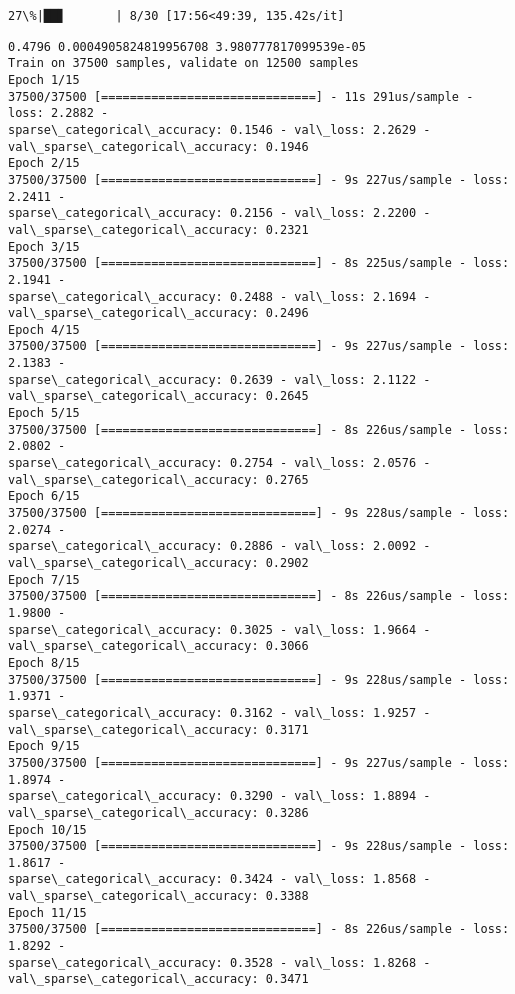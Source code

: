 \documentclass[11pt]{article}
\begin{document}
    \begin{Verbatim}[commandchars=\\\{\}]
 27\%|██▋       | 8/30 [17:56<49:39, 135.42s/it]
    \end{Verbatim}

    \begin{Verbatim}[commandchars=\\\{\}]
0.4796 0.0004905824819956708 3.980777817099539e-05
Train on 37500 samples, validate on 12500 samples
Epoch 1/15
37500/37500 [==============================] - 11s 291us/sample - loss: 2.2882 -
sparse\_categorical\_accuracy: 0.1546 - val\_loss: 2.2629 -
val\_sparse\_categorical\_accuracy: 0.1946
Epoch 2/15
37500/37500 [==============================] - 9s 227us/sample - loss: 2.2411 -
sparse\_categorical\_accuracy: 0.2156 - val\_loss: 2.2200 -
val\_sparse\_categorical\_accuracy: 0.2321
Epoch 3/15
37500/37500 [==============================] - 8s 225us/sample - loss: 2.1941 -
sparse\_categorical\_accuracy: 0.2488 - val\_loss: 2.1694 -
val\_sparse\_categorical\_accuracy: 0.2496
Epoch 4/15
37500/37500 [==============================] - 9s 227us/sample - loss: 2.1383 -
sparse\_categorical\_accuracy: 0.2639 - val\_loss: 2.1122 -
val\_sparse\_categorical\_accuracy: 0.2645
Epoch 5/15
37500/37500 [==============================] - 8s 226us/sample - loss: 2.0802 -
sparse\_categorical\_accuracy: 0.2754 - val\_loss: 2.0576 -
val\_sparse\_categorical\_accuracy: 0.2765
Epoch 6/15
37500/37500 [==============================] - 9s 228us/sample - loss: 2.0274 -
sparse\_categorical\_accuracy: 0.2886 - val\_loss: 2.0092 -
val\_sparse\_categorical\_accuracy: 0.2902
Epoch 7/15
37500/37500 [==============================] - 8s 226us/sample - loss: 1.9800 -
sparse\_categorical\_accuracy: 0.3025 - val\_loss: 1.9664 -
val\_sparse\_categorical\_accuracy: 0.3066
Epoch 8/15
37500/37500 [==============================] - 9s 228us/sample - loss: 1.9371 -
sparse\_categorical\_accuracy: 0.3162 - val\_loss: 1.9257 -
val\_sparse\_categorical\_accuracy: 0.3171
Epoch 9/15
37500/37500 [==============================] - 9s 227us/sample - loss: 1.8974 -
sparse\_categorical\_accuracy: 0.3290 - val\_loss: 1.8894 -
val\_sparse\_categorical\_accuracy: 0.3286
Epoch 10/15
37500/37500 [==============================] - 9s 228us/sample - loss: 1.8617 -
sparse\_categorical\_accuracy: 0.3424 - val\_loss: 1.8568 -
val\_sparse\_categorical\_accuracy: 0.3388
Epoch 11/15
37500/37500 [==============================] - 8s 226us/sample - loss: 1.8292 -
sparse\_categorical\_accuracy: 0.3528 - val\_loss: 1.8268 -
val\_sparse\_categorical\_accuracy: 0.3471

\end{Verbatim}
\end{document}
